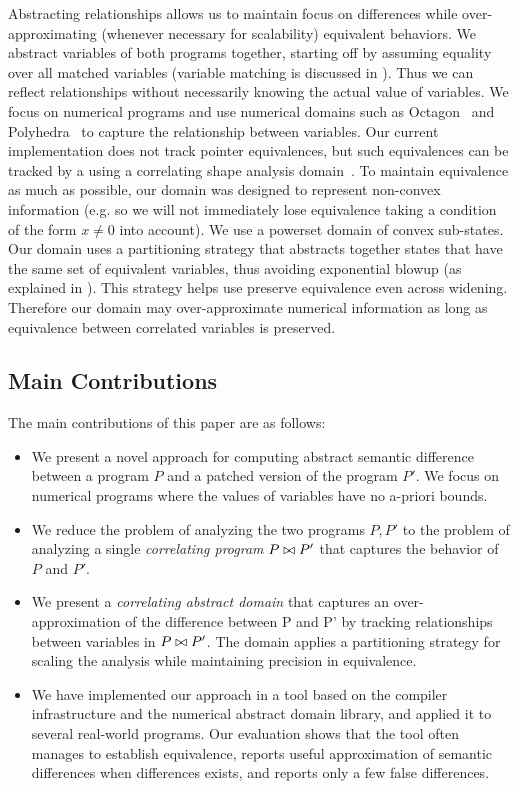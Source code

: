 Abstracting relationships allows us to maintain focus on differences while over-approximating (whenever necessary for scalability) equivalent behaviors. We abstract variables of both programs together, starting off by assuming equality over all matched variables (variable matching is discussed in ). Thus we can
reflect relationships without necessarily knowing the actual value of
variables. We focus on numerical programs and use numerical domains such as Octagon~\cite{Mine2006} and Polyhedra~\cite{CousotHalbwachs78} to capture the relationship between variables. Our current implementation does not track pointer equivalences, but such equivalences can be tracked by a using a correlating shape analysis domain~\cite{AmitRinetzkyRepsSagivYahav07}. To maintain equivalence as much as possible, our domain was designed to represent non-convex information (e.g. so we will not immediately lose equivalence taking a condition of the form $x \neq 0$ into account). We use a powerset domain of convex sub-states. Our domain uses a partitioning strategy that abstracts together states that have the same set of equivalent variables, thus avoiding exponential blowup (as explained in ). This strategy helps use preserve equivalence even across widening. Therefore our domain may over-approximate numerical information as long as equivalence between correlated variables is preserved.

\subsection{Main Contributions}
The main contributions of this paper are as follows:
\begin{itemize}
\item We present a novel approach for computing abstract semantic difference between a program $P$ and a patched version of the program $P'$. We focus on numerical programs where the values of variables have no a-priori bounds.
\item We reduce the problem of analyzing the two programs $P,P'$ to the problem of analyzing a single \emph{correlating program} $P \bowtie P'$ that captures the behavior of $P$ and $P'$.
\item We present a \emph{correlating abstract domain} that captures an over-approximation of the difference between P and P' by tracking relationships between variables in $P \bowtie P'$. The domain applies a partitioning strategy for scaling the analysis while maintaining precision in equivalence.
\item We have implemented our approach in a tool based on the  compiler infrastructure and the  numerical abstract domain library, and applied it to several real-world programs. Our evaluation shows that the tool often manages to establish equivalence, reports useful approximation of semantic differences when differences exists, and reports only a few false differences.
\end{itemize}
